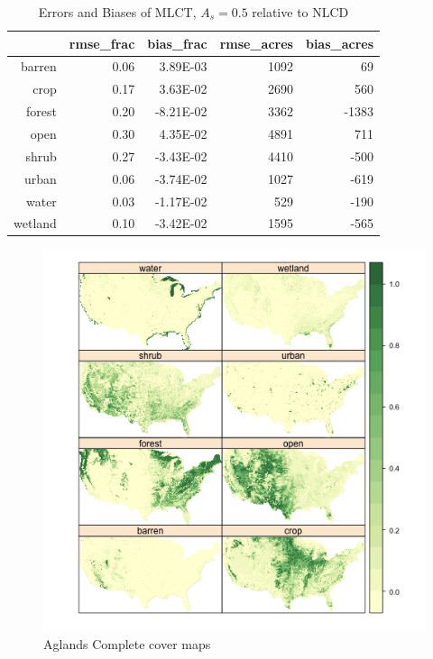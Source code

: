 \begin{table}[ht]
\begin{center}
\begin{tabular}{rrrrr}
  \hline
 & rmse\_frac & bias\_frac & rmse\_acres & bias\_acres \\ 
  \hline
barren & 0.06 & 3.89E-03 & 1092 & 69 \\ 
  crop & 0.17 & 3.63E-02 & 2690 & 560 \\ 
  forest & 0.20 & -8.21E-02 & 3362 & -1383 \\ 
  open & 0.30 & 4.35E-02 & 4891 & 711 \\ 
  shrub & 0.27 & -3.43E-02 & 4410 & -500 \\ 
  urban & 0.06 & -3.74E-02 & 1027 & -619 \\ 
  water & 0.03 & -1.17E-02 & 529 & -190 \\ 
  wetland & 0.10 & -3.42E-02 & 1595 & -565 \\ 
   \hline
\end{tabular}
\caption{Errors and Biases of MLCT, $A_s = 0.5$ relative to NLCD}
\label{tab:ebmlct05}
\end{center}
\end{table}

\begin{figure} 
\begin{center} 


\includegraphics{fig_agc}
\end{center} 
\caption{Aglands Complete cover maps} 
\label{fig:agc} 
\end{figure} 

